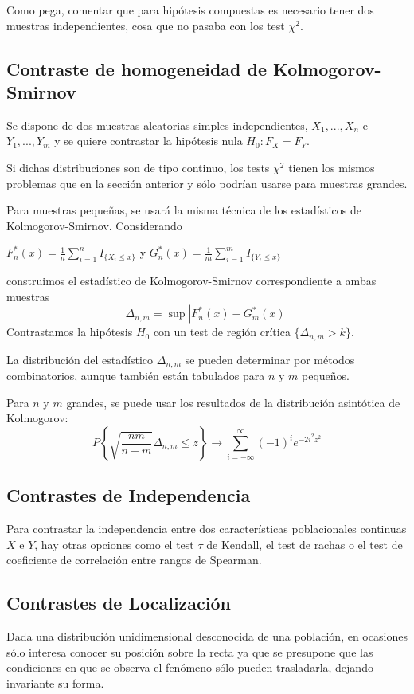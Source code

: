 \documentclass[a4paper,12pt]{article}
\begin{document}
Como pega, comentar que para hipótesis compuestas es necesario tener dos muestras independientes, cosa que no pasaba con los test $\chi^2$.



\subsection{Contraste de homogeneidad de Kolmogorov-Smirnov}

Se dispone de dos muestras aleatorias simples independientes, $X_1,...,X_n $ e $Y_1,...,Y_m$ y se quiere contrastar la hipótesis nula $H_0:F_X = F_Y$.

Si dichas distribuciones son de tipo continuo, los tests $\chi^2$ tienen los mismos problemas que en la sección anterior y sólo podrían usarse para muestras grandes.

Para muestras pequeñas, se usará la misma técnica de los estadísticos de Kolmogorov-Smirnov. Considerando
\begin{center}
$F^*_n (x)=\frac{1}{n}\sum_{i=1}^n I_{\{X_i \leq x\}}$ y $G^*_n (x)=\frac{1}{m}\sum_{i=1}^m I_{\{Y_i \leq x\}}$
\end{center}
construimos el estadístico de Kolmogorov-Smirnov correspondiente a ambas muestras $$\Delta_{n,m}=\sup|F^*_n(x)-G^*_m (x)|$$
Contrastamos la hipótesis $H_0$ con un test de región crítica $\{ \Delta_{n,m} > k\}$.

La distribución del estadístico $\Delta_{n,m}$ se pueden determinar por métodos combinatorios, aunque también están tabulados para $n$ y $m$ pequeños.

Para $n$ y $m$ grandes, se puede usar los resultados de la distribución asintótica de Kolmogorov:
$$P\left\{ \sqrt{\frac{nm}{n+m}}\Delta_{n,m}\leq z\right\}\longrightarrow \sum^{\infty}_{i=-\infty}(-1)^i e^{-2i^2z^2}$$


\subsection{Contrastes de Independencia}
Para contrastar la independencia entre dos características poblacionales continuas $X$ e $Y$, hay otras opciones como el test $\tau$ de Kendall, el test de rachas o el test de coeficiente de correlación entre rangos de Spearman.

\subsection{Contrastes de Localización}
Dada una distribución unidimensional desconocida de una población, en ocasiones sólo interesa conocer su posición sobre la recta ya que se presupone que las condiciones en que se observa el fenómeno sólo pueden trasladarla, dejando invariante su forma.
\end{document}
